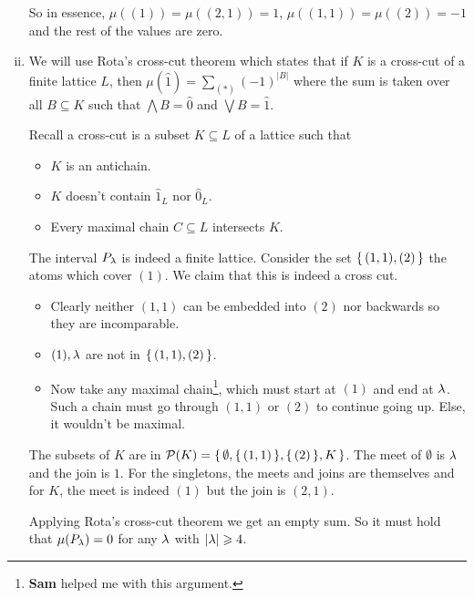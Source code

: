 \documentclass[12pt]{memoir}
\begin{document}
\begin{ptcbr}
\begin{enumerate}[i)]
\begin{center}
        \end{center}
        So in essence, $\mu((1))=\mu((2,1))=1$, $\mu((1,1))=\mu((2))=-1$ and the rest of the values are zero. 
        \item We will use Rota's cross-cut theorem which states that if $K$ is a cross-cut of a finite lattice $L$, then $\mu(\hat{1})=\sum_{(\ast)}(-1)^{|B|}$ where the sum is taken over all $B\subseteq K$ such that $\bigwedge B=\hat{0}$ and $\bigvee B=\hat{1}$.\par 
        Recall a cross-cut is a subset $K\subseteq L$ of a lattice such that 
        \vspace*{-0.4em}
        \begin{itemize}
            \itemsep=-0.4em
            \item $K$ is an antichain.
            \item $K$ doesn't contain $\hat{1}_L$ nor $\hat{0}_L$. 
            \item Every maximal chain $C\subseteq L$ intersects $K$. 
        \end{itemize}
        The interval $P_\lambda$ is indeed a finite lattice. Consider the set $\{\,(1,1),(2)\,\}$ the atoms which cover $(1)$. We claim that this is indeed a cross cut.
        \vspace*{-0.4em}
        \begin{itemize}
            \itemsep=-0.4em
            \item Clearly neither $(1,1)$ can be embedded into $(2)$ nor backwards so they are incomparable. 
            \item $(1),\lambda$ are not in $\{\,(1,1),(2)\,\}$.
            \item Now take any maximal chain\footnote{\textbf{Sam} helped me with this argument.}, which must start at $(1)$ and end at $\lambda$. Such a chain must go through $(1,1)$ or $(2)$ to continue going up. Else, it wouldn't be maximal. 
        \end{itemize}
        The subsets of $K$ are in $\mathcal{P}(K)=\{\,\emptyset,\{\,(1,1)\,\},\{\,(2)\,\},K\,\}$. The meet of $\emptyset$ is $\lambda$ and the join is $1$. For the singletons, the meets and joins are themselves and for $K$, the meet is indeed $(1)$ but the join is $(2,1)$.\par 
        Applying Rota's cross-cut theorem we get an empty sum. So it must hold that $\mu(P_\lambda)=0$ for any $\lambda$ with $|\lambda|\geqslant 4$.
        
    \end{enumerate}
\end{ptcbr}
\end{document}

